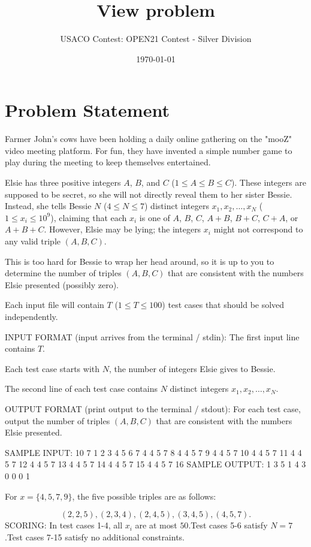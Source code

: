\documentclass[12pt]{article}
\title{View problem}
\author{USACO Contest: OPEN21 Contest - Silver Division}
\date{\today}
\begin{document}
\maketitle

\section*{Problem Statement}

Farmer John's cows have been holding a daily online gathering on the "mooZ" 
video meeting platform.  For fun, they have invented a simple number game to
play during the meeting to keep themselves entertained.

Elsie has three positive integers $A$, $B$, and $C$ ($1\le A\le B\le C$). These
integers are supposed to be secret, so she will not directly reveal them to her
sister Bessie.  Instead, she tells Bessie $N$ ($4\le N\le 7$) distinct
integers $x_1,x_2,\ldots,x_N$ ($1\le x_i\le 10^9$), claiming that each $x_i$ is
one of $A$, $B$, $C$, $A+B$, $B+C$, $C+A$, or $A+B+C$. However, Elsie may be
lying; the integers $x_i$ might not correspond to any valid triple $(A,B,C)$.

This is too hard for Bessie to wrap her head around, so it is up to you to
determine the number of triples $(A,B,C)$ that are consistent with the numbers Elsie
presented (possibly zero).

Each input file will contain $T$ ($1\le T\le 100$) test cases that should be
solved independently.

INPUT FORMAT (input arrives from the terminal / stdin):
The first input line contains $T$.

Each test case starts with $N$, the number of integers Elsie gives to Bessie.

The second line of each test case contains $N$ distinct integers
$x_1,x_2,\ldots,x_N$.

OUTPUT FORMAT (print output to the terminal / stdout):
For each test case, output the number of triples $(A,B,C)$ that are consistent
with the numbers Elsie presented.

SAMPLE INPUT:
10
7
1 2 3 4 5 6 7
4
4 5 7 8
4
4 5 7 9
4
4 5 7 10
4
4 5 7 11
4
4 5 7 12
4
4 5 7 13
4
4 5 7 14
4
4 5 7 15
4
4 5 7 16
SAMPLE OUTPUT: 
1
3
5
1
4
3
0
0
0
1

For $x=\{4,5,7,9\}$, the five possible triples are as follows:

$$(2, 2, 5), (2, 3, 4), (2, 4, 5), (3, 4, 5), (4, 5, 7).$$
SCORING:
In test cases 1-4, all $x_i$ are at most $50$.Test cases 5-6 satisfy $N=7$.Test cases 7-15 satisfy no additional constraints.
\end{document}
